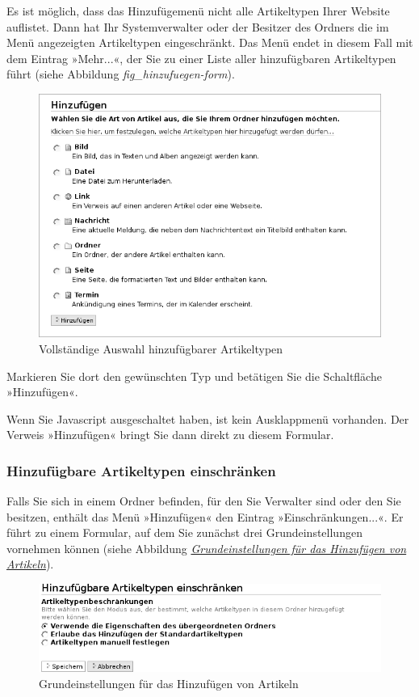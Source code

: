 \documentclass[a4paper,12pt,ngerman]{manual}
\begin{document}
Es ist möglich, dass das Hinzufügemenü nicht alle Artikeltypen Ihrer Website
auflistet. Dann hat Ihr Systemverwalter oder der Besitzer des Ordners die im
Menü angezeigten Artikeltypen eingeschränkt. Das Menü endet in diesem Fall mit
dem Eintrag »Mehr...«, der Sie zu einer Liste aller hinzufügbaren
Artikeltypen führt (siehe Abbildung \emph{fig\_hinzufuegen-form}).
\begin{figure}[htbp]
\centering

\includegraphics{hinzufuegen-form.png}
\caption{Vollständige Auswahl hinzufügbarer Artikeltypen}\end{figure}

Markieren Sie dort den gewünschten Typ und betätigen Sie die Schaltfläche
»Hinzufügen«.

Wenn Sie Javascript ausgeschaltet haben, ist kein Ausklappmenü vorhanden. Der
Verweis »Hinzufügen« bringt Sie dann direkt zu diesem Formular.


\subsubsection{Hinzufügbare Artikeltypen einschränken}

Falls Sie sich in einem Ordner befinden, für den Sie Verwalter sind oder den
Sie besitzen, enthält das Menü »Hinzufügen« den Eintrag
»Einschränkungen...«. Er führt zu einem
Formular, auf dem Sie zunächst drei Grundeinstellungen vornehmen können
(siehe Abbildung \hyperlink{fig-hinzufuegen-typen}{\emph{Grundeinstellungen für das Hinzufügen von Artikeln}}).
\hypertarget{fig-hinzufuegen-typen}{}\begin{figure}[htbp]
\centering

\includegraphics{hinzufuegen-typen-kurz.png}
\caption{Grundeinstellungen für das Hinzufügen von Artikeln}\end{figure}
\end{document}
